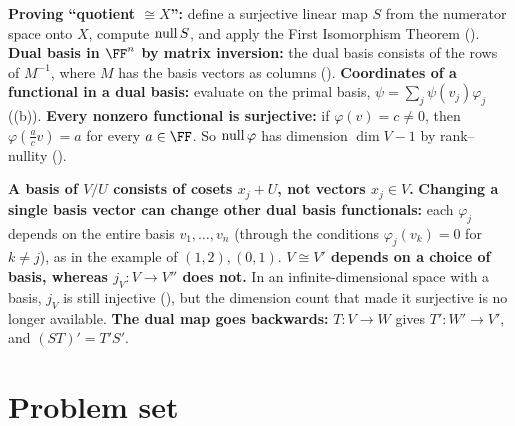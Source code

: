 \documentclass[10pt]{scrartcl}
\begin{document}
\begin{shortcuts}
  \ii \textbf{Proving ``quotient $\cong X$'':} define a surjective linear map $S$ from the numerator space onto $X$, compute $\operatorname{null} S$, and apply the First Isomorphism Theorem ().
  \ii \textbf{Dual basis in $\FF^n$ by matrix inversion:} the dual basis consists of the rows of $M^{-1}$, where $M$ has the basis vectors as columns ().
  \ii \textbf{Coordinates of a functional in a dual basis:} evaluate on the primal basis, $\psi=\sum_j\psi(v_j)\varphi_j$ ((b)).
  \ii \textbf{Every nonzero functional is surjective:} if $\varphi(v)=c\ne0$, then $\varphi(\tfrac{a}{c}v)=a$ for every $a\in\FF$. So $\operatorname{null}\varphi$ has dimension $\dim V-1$ by rank--nullity ().
\end{shortcuts}

\begin{trapbox}
  \ii \textbf{A basis of $V/U$ consists of cosets $x_j+U$, not vectors $x_j\in V$.}
  \ii \textbf{Changing a single basis vector can change other dual basis functionals:} each $\varphi_j$ depends on the entire basis $v_1,\dots,v_n$ (through the conditions $\varphi_j(v_k)=0$ for $k\ne j$), as in the example of $(1,2),(0,1)$.
  \ii \textbf{$V\cong V'$ depends on a choice of basis, whereas $j_V\colon V\to V''$ does not.} In an infinite-dimensional space with a basis, $j_V$ is still injective (), but the dimension count that made it surjective is no longer available.
  \ii \textbf{The dual map goes backwards:} $T\colon V\to W$ gives $T'\colon W'\to V'$, and $(ST)'=T'S'$.
\end{trapbox}

\section{Problem set}
\end{document}
